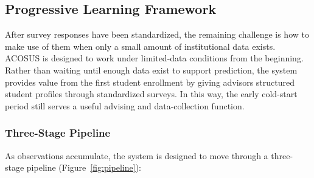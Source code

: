 \documentclass[letterpaper,11pt]{article}
\begin{document}
\begin{figure}[htbp]
{
}
\end{figure}

\subsection{Progressive Learning Framework}\label{subsec:progressive}

After survey responses have been standardized, the remaining challenge is how to make use of them when only a small amount of institutional data exists. ACOSUS is designed to work under limited-data conditions from the beginning. Rather than waiting until enough data exist to support prediction, the system provides value from the first student enrollment by giving advisors structured student profiles through standardized surveys. In this way, the early cold-start period still serves a useful advising and data-collection function.

\subsubsection{Three-Stage Pipeline}

As observations accumulate, the system is designed to move through a three-stage pipeline (Figure~\ref{fig:pipeline}):
\end{document}
